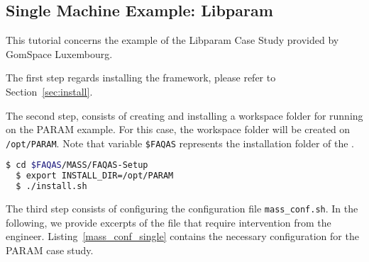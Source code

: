 
\subsection{Single Machine Example: Libparam}
\label{sec:single_machine_libparam}

This tutorial concerns the example of the Libparam Case Study provided by GomSpace Luxembourg.

The first step regards installing the \MASS framework, please refer to Section~\ref{sec:install}.

The second step, consists of creating and installing a workspace folder for running \MASS on the PARAM example. For this case, the workspace folder will be created on \texttt{/opt/PARAM}. Note that variable \texttt{\$FAQAS} represents the installation folder of the \FAQAS.

\begin{lstlisting}[language=bash]
  $ cd $FAQAS/MASS/FAQAS-Setup
  $ export INSTALL_DIR=/opt/PARAM
  $ ./install.sh
\end{lstlisting}

The third step consists of configuring the \MASS configuration file \texttt{mass\_conf.sh}. In the following, we provide excerpts of the file that require intervention from the engineer. Listing~\ref{mass_conf_single} contains the necessary configuration for the PARAM case study.

